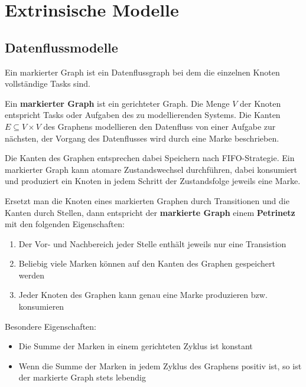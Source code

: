 \chapter{Extrinsische Modelle}
\section{Datenflussmodelle}
Ein markierter Graph ist ein Datenflussgraph bei dem die einzelnen Knoten
vollständige Tasks sind.

\begin{tcolorbox}
    Ein \textbf{markierter Graph} ist ein gerichteter Graph. Die Menge $V$ der Knoten
    entspricht Tasks oder Aufgaben des zu modellierenden Systems. Die Kanten
    $E \subseteq V \times V$ des Graphens modellieren den Datenfluss von einer Aufgabe zur
    nächsten, der Vorgang des Datenflusses wird durch eine Marke beschrieben.

    Die Kanten des Graphen entsprechen dabei Speichern nach FIFO-Strategie.
    Ein markierter Graph kann atomare Zustandswechsel durchführen, dabei
    konsumiert und produziert ein Knoten in jedem Schritt der Zustandsfolge jeweils
    eine Marke.
\end{tcolorbox}

\begin{tcolorbox}
    Ersetzt man die Knoten eines markierten Graphen durch Transitionen und die Kanten
    durch Stellen, dann entspricht der \textbf{markierte Graph} einem \textbf{Petrinetz}
    mit den folgenden Eigenschaften:
    \begin{enumerate}
        \item Der Vor- und Nachbereich jeder Stelle enthält jeweils nur eine Transistion
        \item Beliebig viele Marken können auf den Kanten des Graphen gespeichert werden
        \item Jeder Knoten des Graphen kann genau eine Marke produzieren bzw. konsumieren
    \end{enumerate}
\end{tcolorbox}

Besondere Eigenschaften:
\begin{itemize}
    \item Die Summe der Marken in einem gerichteten Zyklus ist konstant
    \item Wenn die Summe der Marken in jedem Zyklus des Graphens positiv ist,
        so ist der markierte Graph stets lebendig
\end{itemize}

